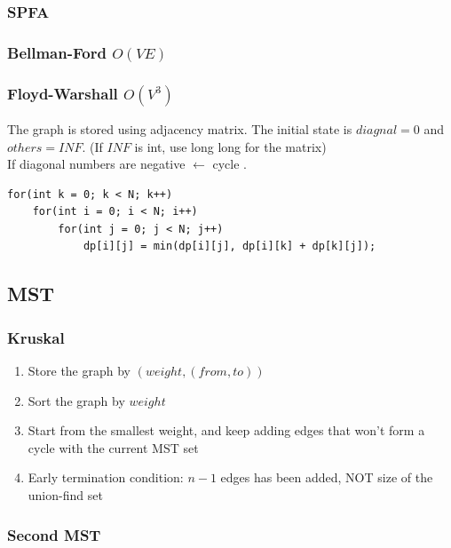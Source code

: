\documentclass[10pt,oneside]{article}
\begin{document}
\begin{landscape}
\begin{multicols}{2}
\subsubsection{SPFA}

\subsubsection{Bellman-Ford $O(VE)$}

\subsubsection{Floyd-Warshall $O(V^3)$}
{\normalsize 
The graph is stored using adjacency matrix. The initial state is $diagnal = 0$ and $others = INF$. (If $INF$ is int, use long long for the matrix)\\
If diagonal numbers are negative $\leftarrow$ cycle . \\
}

\begin{verbatim}
for(int k = 0; k < N; k++)
    for(int i = 0; i < N; i++)
        for(int j = 0; j < N; j++)
            dp[i][j] = min(dp[i][j], dp[i][k] + dp[k][j]);
\end{verbatim}

\subsection{MST}

\subsubsection{Kruskal}

{\normalsize 
\begin{enumerate}
	\item Store the graph by $(weight, (from , to))$
	\item Sort the graph by $weight$ 
	\item Start from the smallest weight, and keep adding edges that won't form a cycle with the current MST set
	\item Early termination condition: $n - 1$ edges has been added, NOT size of the union-find set
\end{enumerate}
}

\subsubsection{Second MST}


\end{multicols}
\end{landscape}
\end{document}
